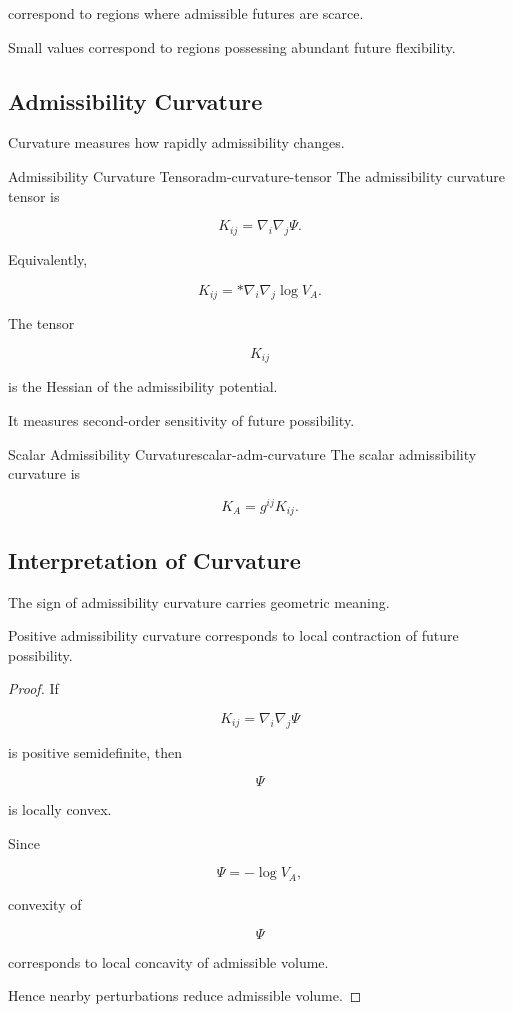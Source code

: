 \documentclass[12pt,twoside,openright]{book}
\newenvironment{prop}
{\begin{proposition}{}{}}
{\end{proposition}}
\begin{document}
correspond to regions where admissible futures are scarce.

Small values correspond to regions possessing abundant
future flexibility.

\subsection{Admissibility Curvature}

Curvature measures how rapidly admissibility changes.

\begin{definition}{Admissibility Curvature Tensor}{adm-curvature-tensor}
The admissibility curvature tensor is

\[
K_{ij}
=

\nabla_i\nabla_j\Psi.
\]
\end{definition}

Equivalently,

\[
K_{ij}
=

*

\nabla_i\nabla_j
\log V_A.
\]

The tensor

\[
K_{ij}
\]

is the Hessian of the admissibility potential.

It measures second-order sensitivity of future
possibility.

\begin{definition}{Scalar Admissibility Curvature}{scalar-adm-curvature}
The scalar admissibility curvature is

\[
K_A
=

g^{ij}K_{ij}.
\]
\end{definition}

\subsection{Interpretation of Curvature}

The sign of admissibility curvature carries geometric
meaning.

\begin{prop}
Positive admissibility curvature corresponds to local
contraction of future possibility.
\end{prop}

\begin{proof}
If

\[
K_{ij}
=

\nabla_i\nabla_j\Psi
\]

is positive semidefinite, then

\[
\Psi
\]

is locally convex.

Since

\[
\Psi
=

-\log V_A,
\]

convexity of

\[
\Psi
\]

corresponds to local concavity of admissible volume.

Hence nearby perturbations reduce admissible volume.
\end{proof}
\end{document}
